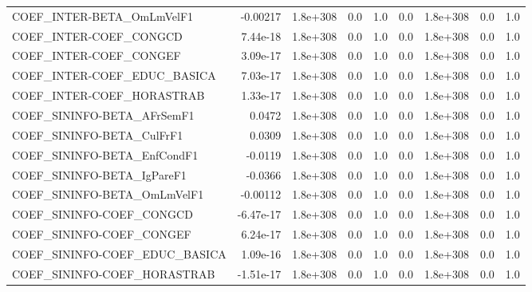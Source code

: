 \begin{tabular}{lrrrrrrrr}
COEF\_INTER-BETA\_OmLmVelF1             &    -0.00217 &     1.8e+308 &     0.0 &      1.0 &        0.0 &    1.8e+308 &          0.0 &           1.0 \\
COEF\_INTER-COEF\_CONGCD                &    7.44e-18 &     1.8e+308 &     0.0 &      1.0 &        0.0 &    1.8e+308 &          0.0 &           1.0 \\
COEF\_INTER-COEF\_CONGEF                &    3.09e-17 &     1.8e+308 &     0.0 &      1.0 &        0.0 &    1.8e+308 &          0.0 &           1.0 \\
COEF\_INTER-COEF\_EDUC\_BASICA           &    7.03e-17 &     1.8e+308 &     0.0 &      1.0 &        0.0 &    1.8e+308 &          0.0 &           1.0 \\
COEF\_INTER-COEF\_HORASTRAB             &    1.33e-17 &     1.8e+308 &     0.0 &      1.0 &        0.0 &    1.8e+308 &          0.0 &           1.0 \\
COEF\_SININFO-BETA\_AFrSemF1            &      0.0472 &     1.8e+308 &     0.0 &      1.0 &        0.0 &    1.8e+308 &          0.0 &           1.0 \\
COEF\_SININFO-BETA\_CulFrF1             &      0.0309 &     1.8e+308 &     0.0 &      1.0 &        0.0 &    1.8e+308 &          0.0 &           1.0 \\
COEF\_SININFO-BETA\_EnfCondF1           &     -0.0119 &     1.8e+308 &     0.0 &      1.0 &        0.0 &    1.8e+308 &          0.0 &           1.0 \\
COEF\_SININFO-BETA\_IgPareF1            &     -0.0366 &     1.8e+308 &     0.0 &      1.0 &        0.0 &    1.8e+308 &          0.0 &           1.0 \\
COEF\_SININFO-BETA\_OmLmVelF1           &    -0.00112 &     1.8e+308 &     0.0 &      1.0 &        0.0 &    1.8e+308 &          0.0 &           1.0 \\
COEF\_SININFO-COEF\_CONGCD              &   -6.47e-17 &     1.8e+308 &     0.0 &      1.0 &        0.0 &    1.8e+308 &          0.0 &           1.0 \\
COEF\_SININFO-COEF\_CONGEF              &    6.24e-17 &     1.8e+308 &     0.0 &      1.0 &        0.0 &    1.8e+308 &          0.0 &           1.0 \\
COEF\_SININFO-COEF\_EDUC\_BASICA         &    1.09e-16 &     1.8e+308 &     0.0 &      1.0 &        0.0 &    1.8e+308 &          0.0 &           1.0 \\
COEF\_SININFO-COEF\_HORASTRAB           &   -1.51e-17 &     1.8e+308 &     0.0 &      1.0 &        0.0 &    1.8e+308 &          0.0 &           1.0 \\

\end{tabular}
